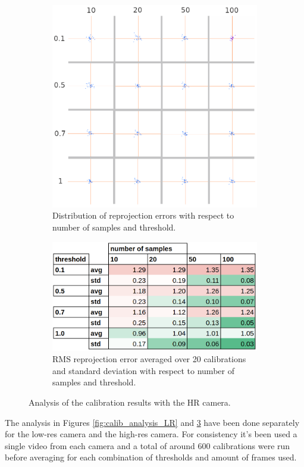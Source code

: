 \begin{figure}[H]
  \centering
  \begin{subfigure}{.5\textwidth}
    \centering
    \includegraphics[width=.8\linewidth]{figures/reprj_dist_HR.png}
    \caption{Distribution of reprojection errors with
    \newline respect to number of samples and threshold.}
    \label{fig:reprj_dist_HR}
  \end{subfigure}%
  \begin{subfigure}{.5\textwidth}
    \centering
    \includegraphics[width=0.8\linewidth]{figures/calib_results_table_HR.png}
    \caption{RMS reprojection error averaged over 20 calibrations and standard deviation with respect to number of samples and threshold.}
    \label{fig:calib_stats_HR}
  \end{subfigure}
  \caption{Analysis of the calibration results with the HR camera.}
  \label{fig:calib_analysis_HR}
\end{figure}
The analysis in Figures \ref{fig:calib_analysis_LR} and \ref{fig:calib_analysis_HR} have been done separately for the low-res camera and the high-res camera. For consistency it's been used a single video from each camera and a total of around 600 calibrations were run before averaging for each combination of thresholds and amount of frames used.

